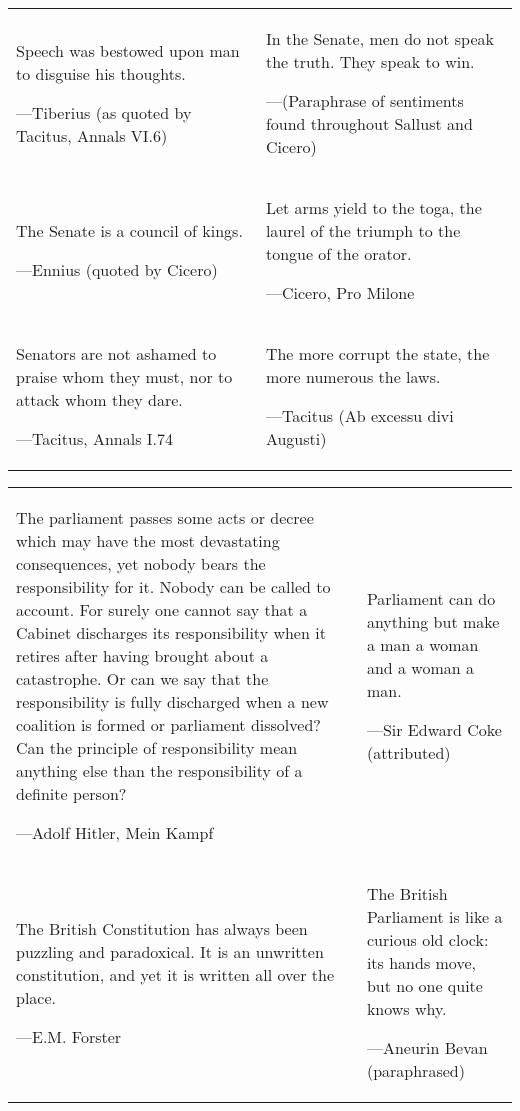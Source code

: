 
\begin{table}[H]
\centering
\small
\begin{tabular}{p{}p{}}
\epigraph{Speech was bestowed upon man to disguise his thoughts.}{---Tiberius (as quoted by Tacitus, Annals VI.6)} &
\epigraph{In the Senate, men do not speak the truth. They speak to win.}{---(Paraphrase of sentiments found throughout Sallust and Cicero)} \\
\epigraph{The Senate is a council of kings.}{---Ennius (quoted by Cicero)} &
\epigraph{Let arms yield to the toga, the laurel of the triumph to the tongue of the orator.}{---Cicero, Pro Milone} \\
\epigraph{Senators are not ashamed to praise whom they must, nor to attack whom they dare.}{---Tacitus, Annals I.74} &
\epigraph{The more corrupt the state, the more numerous the laws.}{---Tacitus (Ab excessu divi Augusti)} \\
\end{tabular}
\end{table}

\begin{table}[H]
\centering
\small
\begin{tabular}{p{}p{}}
\epigraph{The parliament passes some acts or decree which may have the most devastating consequences, yet nobody bears the responsibility for it. Nobody can be called to account. For surely one cannot say that a Cabinet discharges its responsibility when it retires after having brought about a catastrophe. Or can we say that the responsibility is fully discharged when a new coalition is formed or parliament dissolved? Can the principle of responsibility mean anything else than the responsibility of a definite person?}{---Adolf Hitler, Mein Kampf} &
\epigraph{Parliament can do anything but make a man a woman and a woman a man.}{---Sir Edward Coke (attributed)} \\
\epigraph{The British Constitution has always been puzzling and paradoxical. It is an unwritten constitution, and yet it is written all over the place.}{---E.M. Forster} &
\epigraph{The British Parliament is like a curious old clock: its hands move, but no one quite knows why.}{---Aneurin Bevan (paraphrased)} \\
\end{tabular}
\end{table}

